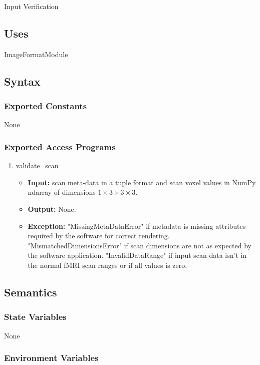 \documentclass[12pt, titlepage]{article}
\begin{document}
Input Verification

\subsection{Uses}
ImageFormatModule

\subsection{Syntax}

\subsubsection{Exported Constants}
None

\subsubsection{Exported Access Programs}

\begin{enumerate}
  \item validate\_scan
        \begin{itemize}
          \item \textbf{Input:} scan meta-data in a tuple format and scan voxel values in NumPy ndarray of dimensions $ 1 \times 3 \times 3 \times 3$.
          \item \textbf{Output:} None.
          \item \textbf{Exception:} "MissingMetaDataError" if metadata is missing attributes required by the software
                for correct rendering. "MismatchedDimensionsError" if scan dimensions are not as expected by the software application.
                "InvalidDataRange" if input scan data isn't in the normal fMRI scan ranges or if all values is zero.
        \end{itemize}
\end{enumerate}

\subsection{Semantics}

\subsubsection{State Variables}

None

\subsubsection{Environment Variables}
\end{document}
